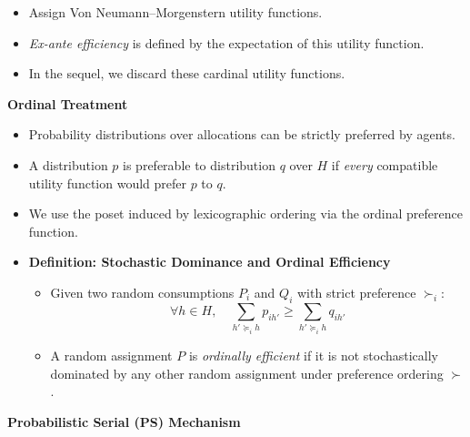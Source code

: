 \documentclass[8pt]{scrartcl}
\renewcommand{\section}[1]{\begin{center}\textbf{\color{red}#1}\end{center}}
\begin{document}
\begin{multicols*}{2}
\begin{itemize}
    \item Assign Von Neumann–Morgenstern utility functions.
    \item \textit{Ex-ante efficiency} is defined by the expectation of this utility function.
    \item In the sequel, we discard these cardinal utility functions.
\end{itemize}

\section{Ordinal Treatment}

\begin{itemize}
    \item Probability distributions over allocations can be strictly preferred by agents.
    \item A distribution $p$ is preferable to distribution $q$ over $H$ if \textit{every} compatible utility function would prefer $p$ to $q$.
    \item We use the poset induced by lexicographic ordering via the ordinal preference function.
    \item \textbf{Definition: Stochastic Dominance and Ordinal Efficiency}
    \begin{itemize}
        \item Given two random consumptions $P_i$ and $Q_i$ with strict preference $\succ_i$:
        $$ \forall h \in H, \quad \sum_{h' \succeq_i h} p_{ih'} \geq \sum_{h' \succeq_i h} q_{ih'} $$
        \item A random assignment $P$ is \textit{ordinally efficient} if it is not stochastically dominated by any other random assignment under preference ordering $\succ$.
    \end{itemize}
\end{itemize}

\section{Probabilistic Serial (PS) Mechanism}


\end{multicols*}
\end{document}
